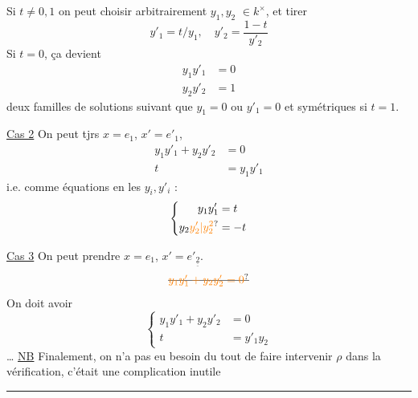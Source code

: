 Si $t\ne0,1$ on peut choisir arbitrairement $y_1,y_2$  $\in k^{\times}$, et tirer 
\[
y'_1=t/y_1,\quad y'_2=\frac{1-t}{y'_2}
\]
Si $t=0$,  ça devient
\[
\begin{aligned} y_1y'_1&=0\\ y_2y'_2&=1\end{aligned}
\]
deux familles de solutions  suivant que $y_1=0$ ou $y'_1=0$ et symétriques si $t=1$.

\uline{Cas 2} On peut tjrs $x=e_1$, $x'=e'_1$, 
\[
\begin{aligned} y_1y'_1+y_2y'_2&=0\\ t&=y_1y'_1\end{aligned}
\]
i.e. comme équations en les $y_i,y'_i$ : 
\[
\left\{\begin{aligned} y_1y'_1&=t\\ y_2\unsure{y'_2|y_2^2}&=-t\end{aligned}\right.
\]

\uline{Cas 3} On peut prendre $x=e_1$, $x'=e'_{\underline{\underline 2}}$.
\[
\deleted{\unsure{y_1y'_1+y_2y'_2=0}}
\]
On doit avoir
\[
\left\{\begin{aligned} y_1y'_1+y_2y'_2&=0\\ t&=y'_1y_2\end{aligned}\right.
\]
 \ldots
\uline{NB} Finalement, on n'a pas eu besoin du tout de faire intervenir $\rho$ dans la vérification, c'était une complication inutile

\begin{center}\rule{3cm}{0.4pt}\end{center}

